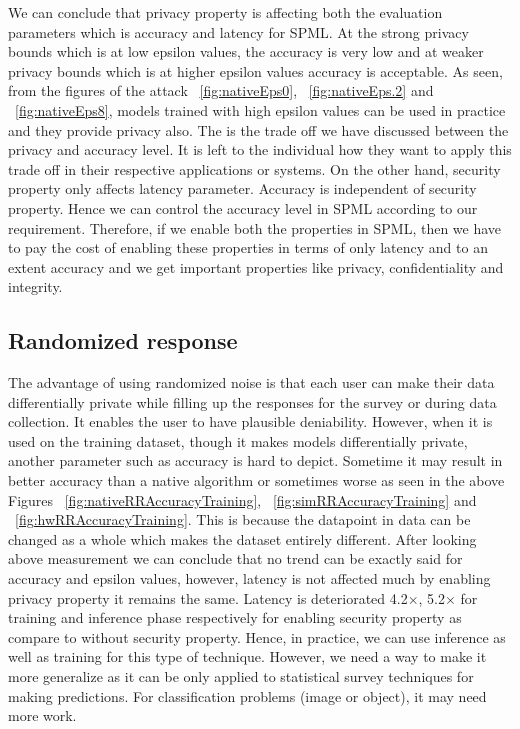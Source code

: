 We can conclude that privacy property is affecting both the evaluation parameters which is accuracy and latency for SPML. At the strong privacy bounds which is at low epsilon values, the accuracy is very low and at weaker privacy bounds which is at higher epsilon values accuracy is acceptable. As seen, from the figures of the attack ~\ref{fig:nativeEps0}, ~\ref{fig:nativeEps.2} and ~\ref{fig:nativeEps8}, models trained with high epsilon values can be used in practice and they provide privacy also. The is the trade off we have discussed between the privacy and accuracy level. It is left to the individual how they want to apply this trade off in their respective applications or systems. On the other hand, security property only affects latency parameter. Accuracy is independent of security property. Hence we can control the accuracy level in SPML according to our requirement. Therefore, if we enable both the properties in SPML, then we have to pay the cost of enabling these properties in terms of only latency and to an extent accuracy and we get important properties like privacy, confidentiality and integrity.

\subsection{Randomized response}
The advantage of using randomized noise is that each user can make their data differentially private while filling up the responses for the survey or during data collection. It enables the user to have plausible deniability. However, when it is used on the training dataset, though it makes models differentially private, another parameter such as accuracy is hard to depict. Sometime it may result in better accuracy than a native algorithm or sometimes worse as seen in the above Figures ~\ref{fig:nativeRRAccuracyTraining}, ~\ref{fig:simRRAccuracyTraining} and ~\ref{fig:hwRRAccuracyTraining}. This is because the datapoint in data can be changed as a whole which makes the dataset entirely different. After looking above measurement we can conclude that no trend can be exactly said for accuracy and epsilon values, however, latency is not affected much by enabling privacy property it remains the same. Latency is deteriorated 4.2$\times$, 5.2$\times$ for training and inference phase respectively for enabling security property as compare to without security property. Hence, in practice, we can use inference as well as training for this type of technique. However, we need a way to make it more generalize as it can be only applied to statistical survey techniques for making predictions. For classification problems (image or object), it may need more work. 

